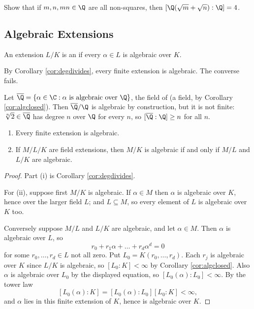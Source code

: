 \begin{exercise}
	Show that if $m, n, mn \in \Q$ are all non-squares, then $[\Q(\sqrt m + \sqrt n):\Q] = 4$.
\end{exercise}

\subsection{Algebraic Extensions}

\begin{definition}
	An extension $L/K$ is an  if every $\alpha \in L$ is algebraic over $K$.
\end{definition}

By Corollary \ref{cor:degdivides}, every finite extension is algebraic. The converse fails.

\begin{example}
	Let $\overline{\Q} = \{\alpha \in \C : \alpha \text{ is algebraic over } \Q\}$, the field of  (a field, by Corollary \ref{cor:algclosed}). Then $\overline{\Q}/\Q$ is algebraic by construction, but it is not finite: $\sqrt[n]{2} \in \overline\Q$ has degree $n$ over $\Q$ for every $n$, so $[\overline\Q : \Q] \geq n$ for all $n$.
\end{example}

\begin{proposition}\label{prop:algebraictower}
	\begin{enumerate}[label=(\roman*)]
		\item Every finite extension is algebraic.
		\item If $M/L/K$ are field extensions, then $M/K$ is algebraic if and only if $M/L$ and $L/K$ are algebraic.
	\end{enumerate}
\end{proposition}

\begin{proof}
	Part (i) is Corollary \ref{cor:degdivides}.

	For (ii), suppose first $M/K$ is algebraic. If $\alpha \in M$ then $\alpha$ is algebraic over $K$, hence over the larger field $L$; and $L \subseteq M$, so every element of $L$ is algebraic over $K$ too.

	Conversely suppose $M/L$ and $L/K$ are algebraic, and let $\alpha \in M$. Then $\alpha$ is algebraic over $L$, so
	$$r_0 + r_1\alpha + \dots + r_d\alpha^d = 0$$
	for some $r_0, \dots, r_d \in L$ not all zero. Put $L_0 = K(r_0, \dots, r_d)$. Each $r_j$ is algebraic over $K$ since $L/K$ is algebraic, so $[L_0 : K] < \infty$ by Corollary \ref{cor:algclosed}. Also $\alpha$ is algebraic over $L_0$ by the displayed equation, so $[L_0(\alpha):L_0] < \infty$. By the tower law
	$$[L_0(\alpha) : K] = [L_0(\alpha):L_0][L_0:K] < \infty,$$
	and $\alpha$ lies in this finite extension of $K$, hence is algebraic over $K$.
\end{proof}

